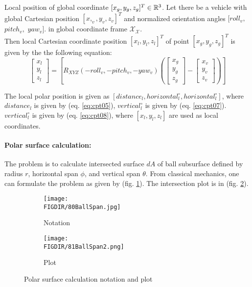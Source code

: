 \begin{definition}{Local position of global coordinate $[x_g,y_g,z_g]^T\in\mathbb{R}^3$.}\label{def:globalToLocal}
    Let there be a vehicle with global Cartesian position $[x,_v,y_v,z_v]^T$ and normalized orientation angles $[roll_v,$ $pitch_v,$ $yaw_v]$. in global coordinate frame $\mathscr{X}_\mathscr{X}$.\\
    
    Then local Cartesian coordinate position $[x_l,y_l,z_l]^T$ of point $[x_g,y_g,z_g]^T$ is given by the the following equation:
    \begin{equation}
        \begin{bmatrix}
            x_l\\y_l\\z_l
        \end{bmatrix}
        =
        \left [
            R_{XYZ}(-roll_v,-pitch_v,-yaw_v)
            \left (
            \begin{bmatrix}
                x_g\\y_g\\z_g
            \end{bmatrix}
            -
            \begin{bmatrix}
                x_v\\y_v\\z_v
            \end{bmatrix}
            \right )
        \right ]
    \end{equation}
    
    The local polar position is given as $[distance_l, horizontal_l^\circ,horizontal_l^\circ]$, where $distance_l$ is given by (eq. \ref{eq:cpt05}), $vertical_l^\circ$ is given by (eq. \ref{eq:cpt07}). $vertical_l^\circ$ is given by (eq. \ref{eq:cpt08}), where $[x_l,y_l,z_l]$ are used as local coordinates.
\end{definition}

\paragraph{Polar surface calculation:} The problem is to calculate intersected surface $dA$ of ball subsurface defined by radius $r$, horizontal span $\phi$, and vertical span $\theta$. From classical mechanics, one can formulate the problem as given by (fig. \ref{fig:80BallSpan}). The intersection plot is in (fig. \ref{fig:81BallSpan2}).

\begin{figure}[H]
    \centering
    \begin{subfigure}[H]{0.3\textwidth}
        \texttt{[image: \\FIGDIR/80BallSpan.jpg]}
        \caption{Notation}
        \label{fig:80BallSpan}
    \end{subfigure}
    \begin{subfigure}[H]{0.3\textwidth}
        \texttt{[image: \\FIGDIR/81BallSpan2.png]}
        \caption{Plot}
        \label{fig:81BallSpan2}
    \end{subfigure}
    \caption{Polar surface calculation notation and plot}
    \label{fig:BallSpanNOTPLOT}
\end{figure}

